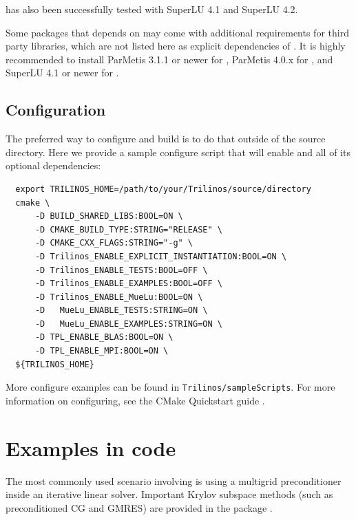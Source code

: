 \begin{mycomment}
\muelu{} has also been successfully tested with SuperLU 4.1 and SuperLU 4.2.
\end{mycomment}
\begin{mycomment}
Some packages that \muelu{} depends on may come with additional requirements for
third party libraries, which are not listed here as explicit dependencies of \muelu{}.
It is highly recommended to install ParMetis 3.1.1 or newer for \zoltan{},
ParMetis 4.0.x for \zoltantwo{}, and SuperLU 4.1 or newer for
\amesostwo{}.
\end{mycomment}

\subsection{Configuration}
The preferred way to configure and build \muelu{} is to do that outside of the source directory.
Here we provide a sample configure script that will enable \muelu{} and all of its optional dependencies:
\begin{lstlisting}
  export TRILINOS_HOME=/path/to/your/Trilinos/source/directory
  cmake \
      -D BUILD_SHARED_LIBS:BOOL=ON \
      -D CMAKE_BUILD_TYPE:STRING="RELEASE" \
      -D CMAKE_CXX_FLAGS:STRING="-g" \
      -D Trilinos_ENABLE_EXPLICIT_INSTANTIATION:BOOL=ON \
      -D Trilinos_ENABLE_TESTS:BOOL=OFF \
      -D Trilinos_ENABLE_EXAMPLES:BOOL=OFF \
      -D Trilinos_ENABLE_MueLu:BOOL=ON \
      -D   MueLu_ENABLE_TESTS:STRING=ON \
      -D   MueLu_ENABLE_EXAMPLES:STRING=ON \
      -D TPL_ENABLE_BLAS:BOOL=ON \
      -D TPL_ENABLE_MPI:BOOL=ON \
  ${TRILINOS_HOME}
\end{lstlisting}

\noindent
More configure examples can be found in \texttt{Trilinos/sampleScripts}.
For more information on configuring, see the \trilinos CMake Quickstart guide \cite{TrilinosCmakeQuickStart}.

\section{Examples in code}
\label{sec:examples in code}

The most commonly used scenario involving \muelu{} is using a multigrid
preconditioner inside an iterative linear solver. Important Krylov subspace
methods (such as preconditioned CG and GMRES) are provided in the \trilinos{}
package \belos.

